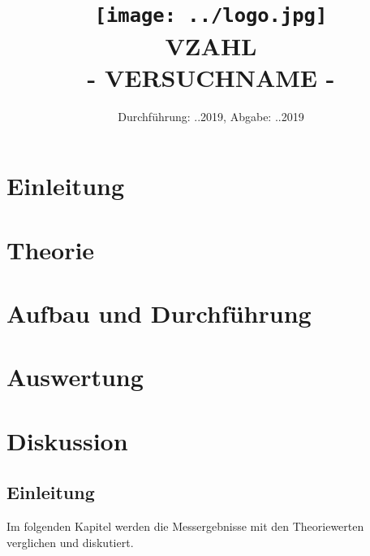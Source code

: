 
\usepackage{romannum}

\title{\texttt{[image: ../logo.jpg]} \\ \vspace*{1cm} VZAHL \\ - VERSUCHNAME -}

\date{Durchführung: ..2019, Abgabe: ..2019}



\maketitle

\tableofcontents
\newpage

\section{Einleitung}

\section{Theorie}

\section{Aufbau und Durchführung}

\section{Auswertung}

\section{Diskussion}

\subsection{Einleitung}
Im folgenden Kapitel werden die Messergebnisse mit den Theoriewerten verglichen und diskutiert.

\subsection{}

\nocite{*}
\printbibliography{}


